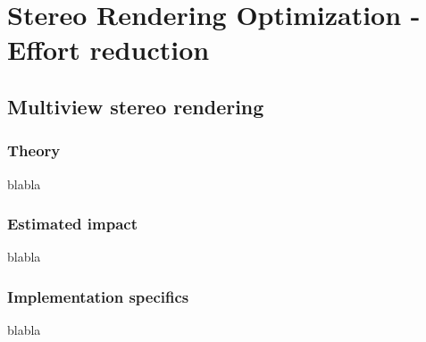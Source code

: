 
\chapter{Stereo Rendering Optimization - Effort reduction}

\section{Multiview stereo rendering}
\subsection{Theory}
blabla
\subsection{Estimated impact}
blabla
\subsection{Implementation specifics}
blabla
